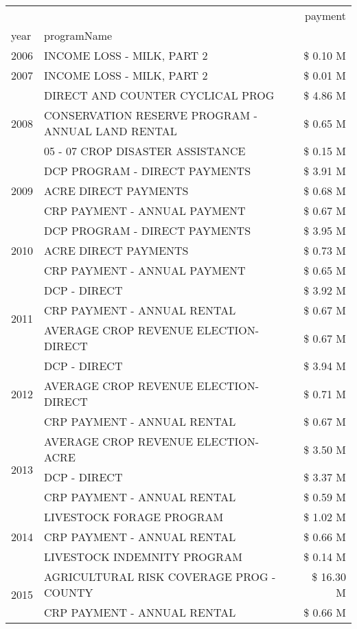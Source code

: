 \begin{tabular}{llr}
\toprule
 &  & payment \\
year & programName &  \\
\midrule
2006 & INCOME LOSS - MILK, PART 2 & \$ 0.10 M \\
\cline{1-3}
2007 & INCOME LOSS - MILK, PART 2 & \$ 0.01 M \\
\cline{1-3}
\multirow[t]{3}{*}{2008} & DIRECT AND COUNTER CYCLICAL PROG & \$ 4.86 M \\
 & CONSERVATION RESERVE PROGRAM - ANNUAL LAND RENTAL & \$ 0.65 M \\
 & 05 - 07 CROP DISASTER ASSISTANCE & \$ 0.15 M \\
\cline{1-3}
\multirow[t]{3}{*}{2009} & DCP PROGRAM - DIRECT PAYMENTS & \$ 3.91 M \\
 & ACRE DIRECT PAYMENTS & \$ 0.68 M \\
 & CRP PAYMENT - ANNUAL PAYMENT & \$ 0.67 M \\
\cline{1-3}
\multirow[t]{3}{*}{2010} & DCP PROGRAM - DIRECT PAYMENTS & \$ 3.95 M \\
 & ACRE DIRECT PAYMENTS & \$ 0.73 M \\
 & CRP PAYMENT - ANNUAL PAYMENT & \$ 0.65 M \\
\cline{1-3}
\multirow[t]{3}{*}{2011} & DCP - DIRECT & \$ 3.92 M \\
 & CRP PAYMENT - ANNUAL RENTAL & \$ 0.67 M \\
 & AVERAGE CROP REVENUE ELECTION-DIRECT & \$ 0.67 M \\
\cline{1-3}
\multirow[t]{3}{*}{2012} & DCP - DIRECT & \$ 3.94 M \\
 & AVERAGE CROP REVENUE ELECTION-DIRECT & \$ 0.71 M \\
 & CRP PAYMENT - ANNUAL RENTAL & \$ 0.67 M \\
\cline{1-3}
\multirow[t]{3}{*}{2013} & AVERAGE CROP REVENUE ELECTION-ACRE & \$ 3.50 M \\
 & DCP - DIRECT & \$ 3.37 M \\
 & CRP PAYMENT - ANNUAL RENTAL & \$ 0.59 M \\
\cline{1-3}
\multirow[t]{3}{*}{2014} & LIVESTOCK FORAGE PROGRAM & \$ 1.02 M \\
 & CRP PAYMENT - ANNUAL RENTAL & \$ 0.66 M \\
 & LIVESTOCK INDEMNITY PROGRAM & \$ 0.14 M \\
\cline{1-3}
\multirow[t]{3}{*}{2015} & AGRICULTURAL RISK COVERAGE PROG - COUNTY & \$ 16.30 M \\
 & CRP PAYMENT - ANNUAL RENTAL & \$ 0.66 M \\

\end{tabular}
